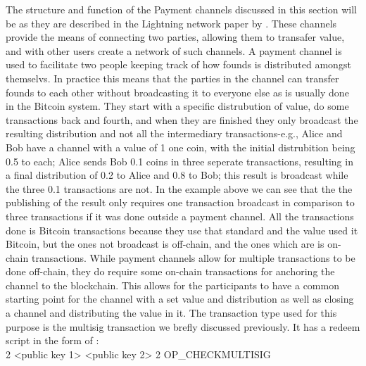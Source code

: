 The structure and function of the Payment channels discussed in this section will be as they are described in the Lightning network paper by . These channels provide the means of connecting two parties, allowing them to transafer value, and with other users create a network of such channels. A payment channel is used to facilitate two people keeping track of how founds is distributed amongst themselvs. In practice this means that the parties in the channel can transfer founds to each other without broadcasting it to everyone else as is usually done in the Bitcoin system. They start with a specific distrubution of value, do some transactions back and fourth, and when they are finished they only broadcast the resulting distribution and not all the intermediary transactions-e.g., Alice and Bob have a channel with a value of 1 one coin, with the initial distrubition being 0.5 to each; Alice sends Bob 0.1 coins in three seperate transactions, resulting in a final distribution of 0.2 to Alice and 0.8 to Bob; this result is broadcast while the three 0.1 transactions are not.
In the example above we can see that the the publishing of the result only requires one transaction broadcast in comparison to three transactions if it was done outside a payment channel. All the transactions done is Bitcoin transactions because they use that standard and the value used it Bitcoin, but the ones not broadcast is off-chain, and the ones which are is on-chain transactions.
While payment channels allow for multiple transactions to be done off-chain, they do require some on-chain transactions for anchoring the channel to the blockchain. This allows for the participants to have a common starting point for the channel with a set value and distribution as well as closing a channel and distributing the value in it.
The transaction type used for this purpose is the multisig transaction we brefly discussed previously. It has a redeem script in the form of :
\\

2 <public key 1> <public key 2> 2 OP\_CHECKMULTISIG
\\

